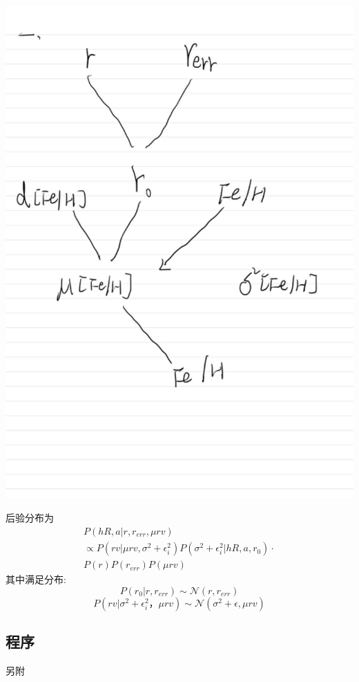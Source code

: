 \documentclass[12pt, letterpaper]{article}
\begin{document}
\includegraphics[scale=0.333]{A.png}

后验分布为
\begin{equation}
\begin{split}
	P(hR, a|r, r_{err}, \mu rv)\\
	\propto P(rv|\mu rv, \sigma^2+\epsilon_i^2)P(\sigma^2+\epsilon_i^2|hR, a, r_0)\cdot\\
P(r)P(r_{err})P(\mu rv)
\end{split}
\end{equation}
其中满足分布:
\begin{equation}
	P(r_0|r, r_{err})\sim \mathcal{N}(r,r_{err})
\end{equation}
\begin{equation}
	P(rv|\sigma^2+\epsilon_i^2， \mu rv)\sim \mathcal{N}(\sigma^2+\epsilon, \mu rv)
\end{equation}
\subsection{程序}
另附
\end{document}
